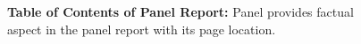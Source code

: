 \begin{figure}[t!]
    \centering
    \caption{
        {\bf Table of Contents of Panel Report: }Panel provides 
        factual aspect in the panel report with its page location.
        }
    \label{fig:panel-report-toc}
\end{figure}
